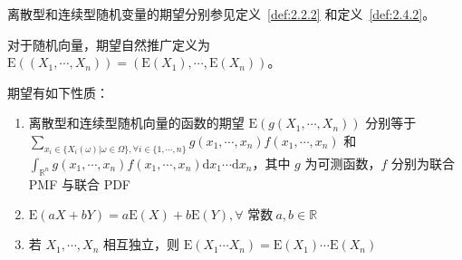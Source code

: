 \documentclass[../main.tex]{subfiles}
\begin{document}
离散型和连续型随机变量的期望分别参见定义~\ref{def:2.2.2} 和定义~\ref{def:2.4.2}。

对于随机向量，期望自然推广定义为 $\mathrm E((X_1,\cdots,X_n))=(\mathrm E(X_1),\cdots,\mathrm E(X_n))$。

\begin{proposition}
期望有如下性质：
\begin{enumerate}
    \item 离散型和连续型随机向量的函数的期望 $\mathrm E(g(X_1,\cdots,X_n))$ 分别等于\\
$\sum_{x_i\in\{X_i(\omega)|\omega\in\Omega\},\forall i\in\{1,\cdots,n\}}g(x_1,\cdots,x_n)f(x_1,\cdots,x_n)$ 和 $\int_{\mathbb R^n}g(x_1,\cdots,x_n)f(x_1,\cdots,x_n)\mathrm dx_1\cdots\mathrm dx_n$，其中 $g$ 为可测函数，$f$ 分别为联合 PMF 与联合 PDF
    \item $\mathrm E(aX+bY)=a\mathrm E(X)+b\mathrm E(Y),\forall\text{ 常数}\ a,b\in\mathbb R$
    \item 若 $X_1,\cdots,X_n$ 相互独立，则 $\mathrm E(X_1\cdots X_n)=\mathrm E(X_1)\cdots\mathrm E(X_n)$
\end{enumerate}
\end{proposition}
\end{document}
